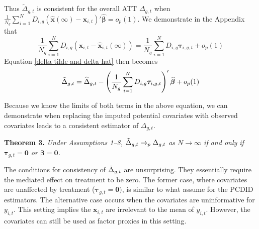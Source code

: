 \documentclass[12pt,fleqn]{article}
\def\*#1{\mathbf{#1}}
\def\+#1{\boldsymbol{#1}}
\begin{document}
Thus $\tilde{\Delta}_{g,t}$ is consistent for the overall ATT $\Delta_{g,t}$ when $\frac{1}{N_g} \sum_{i = 1}^N D_{i,g} (\widehat{\*x}(\infty) - \*x_{i,t})' \widehat{\+\beta} = o_p(1)$. We demonstrate in the Appendix that
\begin{equation}
    \frac{1}{N_g} \sum_{i = 1}^N D_{i,g} (\*x_{i,t} - \widehat{\*x}_{i,t}(\infty)) = \frac{1}{N_g} \sum_{i = 1}^N D_{i,g} \+\tau_{i,g,t} + o_p(1)
\end{equation}
Equation \eqref{delta tilde and delta hat} then becomes
\begin{equation}
    \Tilde{\Delta}_{g,t} = \widehat{\Delta}_{g,t} - \left( \frac{1}{N_g} \sum_{i = 1}^N D_{i,g} \+\tau_{i,g,t} \right)' \widehat{\+\beta} + o_p(1)
\end{equation}

Because we know the limits of both terms in the above equation, we can demonstrate when replacing the imputed potential covariates with observed covariates leads to a consistent estimator of $\Delta_{g,t}$.

\noindent \textbf{Theorem 3.} \emph{Under Assumptions 1--8, $\Tilde{\Delta}_{g,t} \to_p \Delta_{g,t}$ as $N \to \infty$ if and only if $\+\tau_{g,t} = \*0$ or $\+\beta = \*0$.}

\bigskip

The conditions for consistency of $\Tilde{\Delta}_{g,t}$ are unsurprising. They essentially require the mediated effect on treatment to be zero. The former case, where covariates are unaffected by treatment ($\+\tau_{g,t} = \*0)$, is similar to what \citet{chan2022pcdid} assume for the PCDID estimators. The alternative case occurs when the covariates are uninformative for $y_{i,t}$. This setting implies the $\*x_{i,t}$ are irrelevant to the mean of $y_{i,t}$. However, the covariates can still be used as factor proxies in this setting.






\end{document}
